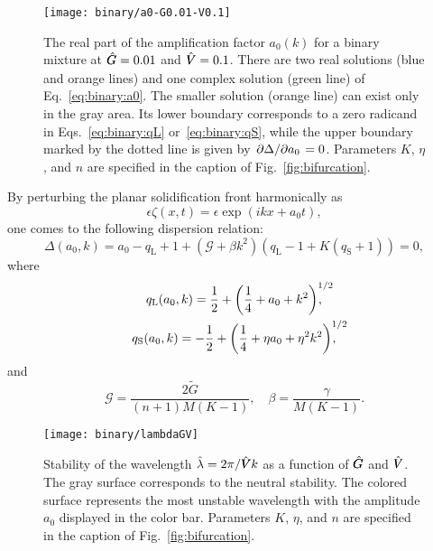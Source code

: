 \documentclass{article}
\newcommand{\liq}{\text{L}}
\newcommand{\sol}{\text{S}}
\newcommand{\qL}{q_\liq}
\newcommand{\qS}{q_\sol}
\newcommand{\hV}[1][\qty(\bar{V})]{\vphantom{#1}\mathrlap{\smash{\hat{V}}}V}
\newcommand{\hG}[1][\qty(\bar{G})]{\vphantom{#1}\mathrlap{\smash{\hat{G}}}G}
\begin{document}
\begin{figure}
    \centering
    \texttt{[image: binary/a0-G0.01-V0.1]}
    \caption{
        The real part of the amplification factor $a_0(k)$ for a binary mixture at $\hG=0.01$ and $\hV=0.1$.
        There are two real solutions (blue and orange lines)
        and one complex solution (green line) of Eq.~\eqref{eq:binary:a0}.
        The smaller solution (orange line) can exist only in the gray area.
        Its lower boundary corresponds to a zero radicand in Eqs.~\eqref{eq:binary:qL} or~\eqref{eq:binary:qS},
        while the upper boundary marked by the dotted line is given by $\pdv*{\Delta}{a_0}=0$.
        Parameters $K$, $\eta$, and $n$ are specified in the caption of Fig.~\ref{fig:bifurcation}.
    }\label{fig:binary:a0}
\end{figure}

By perturbing the planar solidification front harmonically as
\begin{equation}\label{eq:binary:perturbation}
    \epsilon\zeta(x,t) = \epsilon\exp(ikx + a_0t),
\end{equation}
one comes to the following dispersion relation:
\begin{equation}\label{eq:binary:a0}
    \Delta(a_0,k) = a_0 - \qL+1 + (\mathcal{G} + \beta k^2)(\qL-1 + K(\qS+1)) = 0,
\end{equation}
where
\begin{gather}
    \qL(a_0,k) = \frac12 + \qty(\frac14 + a_0 + k^2)^{\mathrlap{1/2}}, \label{eq:binary:qL}\\
    \qS(a_0,k) = -\frac12 + \qty(\frac14 + \eta a_0 + \eta^2k^2)^{\mathrlap{1/2}}, \label{eq:binary:qS}
\end{gather}
and
\begin{equation}\label{eq:Gbeta}
    \mathcal{G} = \frac{2\tilde{G}}{(n+1)M(K-1)}, \quad
    \beta = \frac{\gamma}{M(K-1)}.
\end{equation}

\begin{figure}
    \centering
    \vspace{-80pt}
    \texttt{[image: binary/lambdaGV]}
    \caption{
        Stability of the wavelength $\hat\lambda=2\pi/\hV k$ as a function of $\hG$ and $\hV$.
        The gray surface corresponds to the neutral stability.
        The colored surface represents the most unstable wavelength with the amplitude $a_0$ displayed in the color bar.
        Parameters $K$, $\eta$, and $n$ are specified in the caption of Fig.~\ref{fig:bifurcation}.
    }\label{fig:binary:lambdaGV}
\end{figure}
\end{document}
